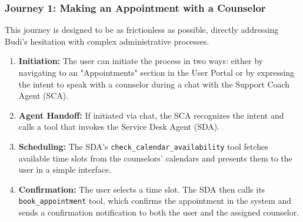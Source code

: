 \subsubsection{Journey 1: Making an Appointment with a Counselor}
This journey is designed to be as frictionless as possible, directly addressing Budi's hesitation with complex administrative processes.
\begin{enumerate}
    \item \textbf{Initiation:} The user can initiate the process in two ways: either by navigating to an "Appointments" section in the User Portal or by expressing the intent to speak with a counselor during a chat with the Support Coach Agent (SCA).
    \item \textbf{Agent Handoff:} If initiated via chat, the SCA recognizes the intent and calls a tool that invokes the Service Desk Agent (SDA).
    \item \textbf{Scheduling:} The SDA's \texttt{check\_calendar\_availability} tool fetches available time slots from the counselors' calendars and presents them to the user in a simple interface.
    \item \textbf{Confirmation:} The user selects a time slot. The SDA then calls its \texttt{book\_appointment} tool, which confirms the appointment in the system and sends a confirmation notification to both the user and the assigned counselor.
\end{enumerate}

